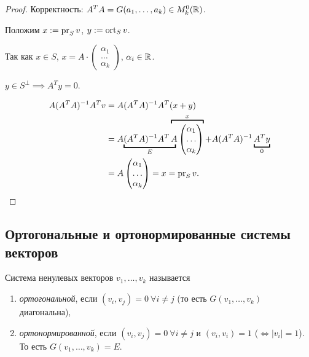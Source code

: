 \begin{proof}
    Корректность: $A^{T} A = G(a_1, \dots, a_k) \in M_k^{0}(\mathbb{R})$.

    Положим $x := \operatorname{\mathop{\mathrm{pr}}}_S v$, $y := \operatorname{\mathop{\mathrm{ort}}}_S v$.

    Так как $x \in S$, $x = A \cdot \begin{pmatrix} \alpha_1 \\ \dots \\ \alpha_k \end{pmatrix}$, $\alpha_i \in \mathbb{R}$.

    $y \in S^{\perp} \implies A^T y = 0$.

    \begin{align*}
    A (A^{T} A)^{-1} A^{T} v
    &= A(A^{T}A)^{-1}A^{T} (x + y) \\
    &= A\lefteqn{\underbracket{\phantom{(A^{T}A)^{-1}A^{T} A}}_E} (A^{T} A)^{-1} A^{T} \overbracket{A \begin{pmatrix} \alpha_1 \\ \dots \\ \alpha_k \end{pmatrix}}^{x} + A(A^{T} A)^{-1} \underbracket{A^{T} y}_{0} \\
    &= A \begin{pmatrix} \alpha_1 \\ \dots \\ \alpha_k \end{pmatrix} = x = \pr_S v
    .\end{align*}
\end{proof}


\subsection{Ортогональные и ортонормированные системы векторов}

\begin{definition}
    Система ненулевых векторов $v_1, \dots, v_k$ называется
    \begin{enumerate}[nosep]
        \item \textit{ортогональной}, если $(v_i, v_j) = 0 \ \forall i \neq j$ (то есть $G(v_1, \dots, v_k)$ диагональна),
        \item \textit{ортонормированной}, если $(v_i, v_j) = 0 \ \forall i \neq j$ и $(v_i, v_i) = 1$ ($\iff |v_i| = 1$).
            То есть $G(v_1, \dots, v_k) = E$.
    \end{enumerate}
\end{definition}

